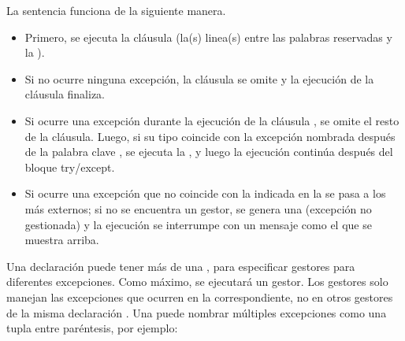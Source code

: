 \documentclass[a4,10pt,spanish]{sphinxmanual}
\begin{document}
\sphinxAtStartPar
La sentencia  funciona de la siguiente manera.
\begin{itemize}
\item {} 
\sphinxAtStartPar
Primero, se ejecuta la cláusula  (la(s) linea(s) entre las palabras reservadas  y la ).

\item {} 
\sphinxAtStartPar
Si no ocurre ninguna excepción, la cláusula  se omite y la ejecución de la cláusula  finaliza.

\item {} 
\sphinxAtStartPar
Si ocurre una excepción durante la ejecución de la cláusula , se omite el resto de la cláusula. Luego, si su tipo coincide con la excepción nombrada después de la palabra clave , se ejecuta la , y luego la ejecución continúa después del bloque try/except.

\item {} 
\sphinxAtStartPar
Si ocurre una excepción que no coincide con la indicada en la  se pasa a los  más externos; si no se encuentra un gestor, se genera una  (excepción no gestionada) y la ejecución se interrumpe con un mensaje como el que se muestra arriba.

\end{itemize}

\sphinxAtStartPar
Una declaración  puede tener más de una , para especificar gestores para diferentes excepciones. Como máximo, se ejecutará un gestor. Los gestores solo manejan las excepciones que ocurren en la  correspondiente, no en otros gestores de la misma declaración . Una  puede nombrar múltiples excepciones como una tupla entre paréntesis, por ejemplo:

\begin{sphinxVerbatim}[commandchars=\\\{\}]
    
     
\end{sphinxVerbatim}
\end{document}
